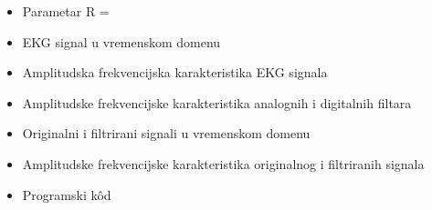 
\begin{itemize}
    \item Parametar R = 
    \item EKG signal u vremenskom domenu
    \item Amplitudska frekvencijska karakteristika EKG signala
    \item Amplitudske frekvencijske karakteristika analognih i digitalnih filtara
    \item Originalni i filtrirani signali u vremenskom domenu
    \item Amplitudske frekvencijske karakteristika originalnog i filtriranih signala
    \item Programski k\^{o}d 
\end{itemize}